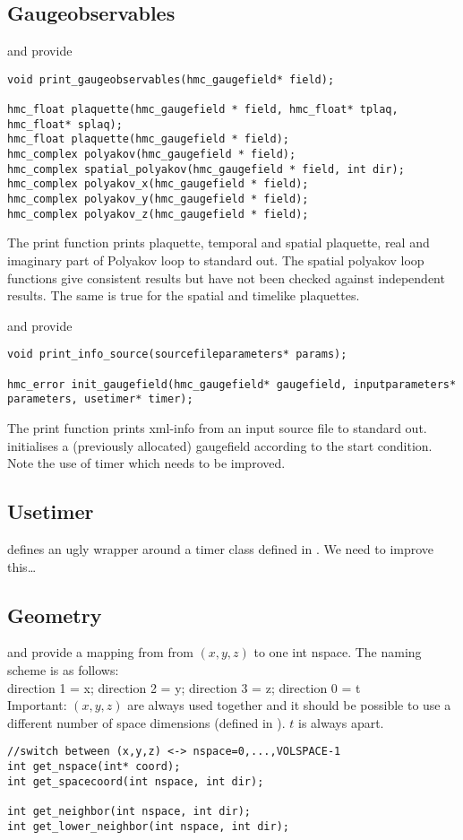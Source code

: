 \subsection{Gaugeobservables}
 and  provide
\begin{verbatim}
void print_gaugeobservables(hmc_gaugefield* field);

hmc_float plaquette(hmc_gaugefield * field, hmc_float* tplaq, hmc_float* splaq);
hmc_float plaquette(hmc_gaugefield * field);
hmc_complex polyakov(hmc_gaugefield * field);
hmc_complex spatial_polyakov(hmc_gaugefield * field, int dir);
hmc_complex polyakov_x(hmc_gaugefield * field);
hmc_complex polyakov_y(hmc_gaugefield * field);
hmc_complex polyakov_z(hmc_gaugefield * field);
\end{verbatim}
The print function prints plaquette, temporal and spatial plaquette, real and imaginary part of Polyakov loop to standard out. The spatial polyakov loop functions give consistent results but have not been checked against independent results. The same is true for the spatial and timelike plaquettes.

 and  provide
\begin{verbatim}
void print_info_source(sourcefileparameters* params);

hmc_error init_gaugefield(hmc_gaugefield* gaugefield, inputparameters* parameters, usetimer* timer);
\end{verbatim}
The print function prints xml-info from an input source file to standard out.  initialises a (previously allocated) gaugefield according to the start condition. Note the use of timer which needs to be improved.


\subsection{Usetimer}
 defines an ugly wrapper around a timer class defined in . We need to improve this\ldots

\subsection{Geometry}
 and  provide a mapping from from $(x,y,z)$ to one int nspace. The naming scheme is as follows:\\
direction 1 = x; direction 2 = y; direction 3 = z; direction 0 = t\\
Important: $(x,y,z)$ are always used together and it should be possible to use a different number of space dimensions (defined in ). $t$ is always apart.
\begin{verbatim}
//switch between (x,y,z) <-> nspace=0,...,VOLSPACE-1
int get_nspace(int* coord);
int get_spacecoord(int nspace, int dir);

int get_neighbor(int nspace, int dir);
int get_lower_neighbor(int nspace, int dir);
\end{verbatim}

